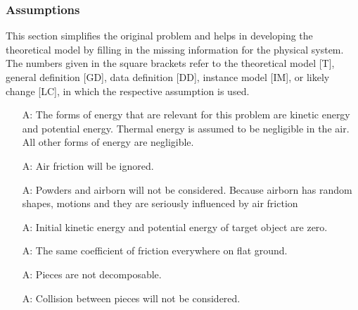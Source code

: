 \documentclass[12pt]{article}
\newcounter{assumpnum} %
\begin{document}
\subsubsection{Assumptions}

This section simplifies the original problem and helps in developing the
theoretical model by filling in the missing information for the physical
system. The numbers given in the square brackets refer to the theoretical model
[T], general definition [GD], data definition [DD], instance model [IM], or
likely change [LC], in which the respective assumption is used.

\begin{itemize}

\item[A\refstepcounter{assumpnum}\theassumpnum \label{A_mechanical}:]
 The forms of energy that are relevant for this problem are kinetic energy and
 potential energy. Thermal energy is assumed to be negligible in the air. All
 other forms of energy are negligible. 

\item[A\refstepcounter{assumpnum}\theassumpnum \label{A_airFriction}:]
Air friction will be ignored.

\item[A\refstepcounter{assumpnum}\theassumpnum \label{A_powder}:]
Powders and airborn  will not be considered. Because airborn
has random shapes, motions and they are seriously influenced by air friction
 

\item[A\refstepcounter{assumpnum}\theassumpnum \label{A_initialPE}:]
Initial kinetic energy and potential energy of target object are zero. 

\item[A\refstepcounter{assumpnum}\theassumpnum \label{A_ground}:]
The same coefficient of friction everywhere on flat ground.​

\item[A\refstepcounter{assumpnum}\theassumpnum \label{A_piece}:]
Pieces are not decomposable. 

\item[A\refstepcounter{assumpnum}\theassumpnum \label{A_collision}:]
Collision between pieces will not be considered. 

\end{itemize}
\end{document}

